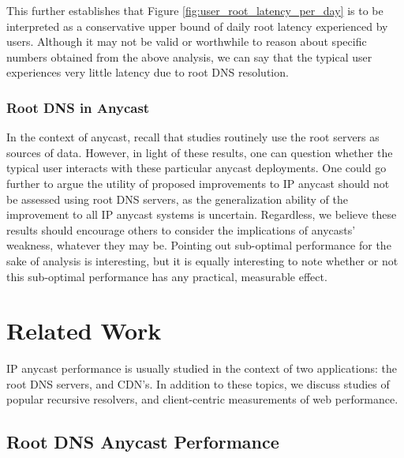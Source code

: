 \documentclass[sigconf,nonacm,10pt]{acmart}
\begin{document}
This further establishes that Figure \ref{fig:user_root_latency_per_day}
is to be interpreted as a conservative upper bound of daily root latency
experienced by users. \break
Although it may not be valid or worthwhile to reason about specific
numbers obtained from the above analysis, we can say that the typical
user experiences very little latency due to root DNS resolution.

\subsubsection{Root DNS in Anycast}\label{root-dns-in-anycast}

In the context of anycast, recall that studies routinely use the root
servers as sources of data. However, in light of these results, one can
question whether the typical user interacts with these particular
anycast deployments. One could go further to argue the utility of
proposed improvements to IP anycast should not be assessed using root
DNS servers, as the generalization ability of the improvement to all IP
anycast systems is uncertain. \break
Regardless, we believe these results should encourage others to consider
the implications of anycasts' weakness, whatever they may be. Pointing
out sub-optimal performance for the sake of analysis is interesting, but
it is equally interesting to note whether or not this sub-optimal
performance has any practical, measurable effect.

\section{Related Work}\label{related-work-1}

IP anycast performance is usually studied in the context of two
applications: the root DNS servers, and CDN's. In addition to these
topics, we discuss studies of popular recursive resolvers, and
client-centric measurements of web performance.

\subsection{Root DNS Anycast
Performance}\label{root-dns-anycast-performance}
\end{document}
